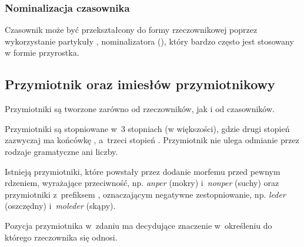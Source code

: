 \begin{spacing}{1.1}


\subsubsection{Nominalizacja czasownika}

Czasownik może być przekształcony do formy rzeczownikowej poprzez wykorzystanie
partykuły , nominalizatora (\Nmz{}), który bardzo często jest stosowany w
formie przyrostka.




\subsection{Przymiotnik oraz imiesłów przymiotnikowy}

Przymiotniki są tworzone zarówno od rzeczowników, jak i od czasowników.

Przymiotniki są stopniowane w~3 stopniach (w większości), gdzie drugi stopień
zazwyczaj ma końcówkę , a~trzeci stopień . Przymiotnik nie
ulega odmianie przez rodzaje gramatyczne ani liczby.

Istnieją przymiotniki, które powstały przez dodanie morfemu  przed
pewnym rdzeniem, wyrażające przeciwność, np. \emph{anper}  (mokry)
i~\emph{nonper}  (suchy) oraz przymiotniki z~prefiksem ,
oznaczającym negatywne zestopniowanie, np. \emph{leder}  (oszczędny)
i~\emph{moleder}  (skąpy).

Pozycja przymiotnika w~zdaniu ma decydujące znaczenie w~określeniu do którego
rzeczownika się odnosi.




\end{spacing}
